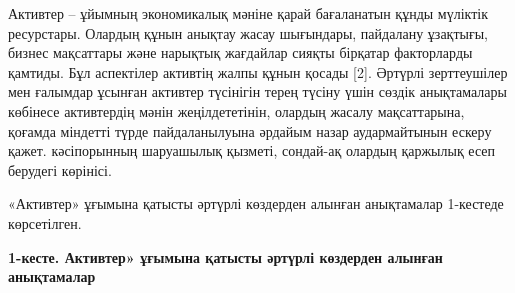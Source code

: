 {Активтер -- ұйымның экономикалық мәніне қарай бағаланатын құнды мүліктік
ресурстары. Олардың құнын анықтау жасау шығындары, пайдалану ұзақтығы,
бизнес мақсаттары және нарықтық жағдайлар сияқты бірқатар факторларды
қамтиды. Бұл аспектілер активтің жалпы құнын қосады {[}2{]}. Әртүрлі
зерттеушілер мен ғалымдар ұсынған активтер түсінігін терең түсіну үшін
сөздік анықтамалары көбінесе активтердің мәнін жеңілдететінін, олардың
жасалу мақсаттарына, қоғамда міндетті түрде пайдаланылуына әрдайым назар
аудармайтынын ескеру қажет. кәсіпорынның шаруашылық қызметі, сондай-ақ
олардың қаржылық есеп берудегі көрінісі.

«Активтер» ұғымына қатысты әртүрлі көздерден алынған анықтамалар
1-кестеде көрсетілген.

{\bfseries 1-кесте. Активтер» ұғымына қатысты әртүрлі көздерден алынған
анықтамалар}


}
